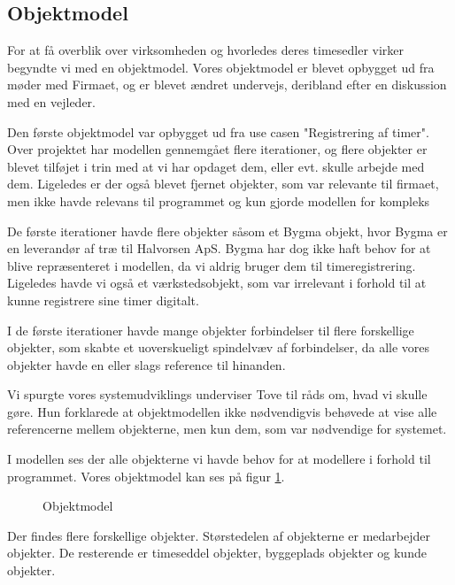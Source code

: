 \subsection{Objektmodel}

For at få overblik over virksomheden og hvorledes deres timesedler virker begyndte vi med en objektmodel.
Vores objektmodel er blevet opbygget ud fra møder med Firmaet, og er blevet ændret undervejs, deribland efter en diskussion med en vejleder.

Den første objektmodel var opbygget ud fra use casen "Registrering af timer".
Over projektet har modellen gennemgået flere iterationer, og flere objekter er blevet tilføjet i trin med at vi har opdaget dem, eller evt. skulle arbejde med dem.
Ligeledes er der også blevet fjernet objekter, som var relevante til firmaet, men ikke havde relevans til programmet og kun gjorde modellen for kompleks

De første iterationer havde flere objekter såsom et Bygma objekt, hvor Bygma er en leverandør af træ til Halvorsen ApS. Bygma har dog ikke haft behov for at blive repræsenteret i modellen, da vi aldrig bruger dem til timeregistrering.
Ligeledes havde vi også et værkstedsobjekt, som var irrelevant i forhold til at kunne registrere sine timer digitalt.

I de første iterationer havde mange objekter forbindelser til flere forskellige objekter, som skabte et uoverskueligt spindelvæv af forbindelser, da alle vores objekter havde en eller slags reference til hinanden. 

Vi spurgte vores systemudviklings underviser Tove til råds om, hvad vi skulle gøre. Hun forklarede at objektmodellen ikke nødvendigvis behøvede at vise alle referencerne mellem objekterne, men kun dem, som var nødvendige for systemet.

I modellen ses der alle objekterne vi havde behov for at modellere i forhold til programmet. Vores objektmodel kan ses på figur \ref{fig:Objektmodel}.

\begin{figure}[H]
    \caption{Objektmodel}
    \label{fig:Objektmodel}
\end{figure}

Der findes flere forskellige objekter. Størstedelen af objekterne er medarbejder objekter. De resterende er timeseddel objekter, byggeplads objekter og kunde objekter. 